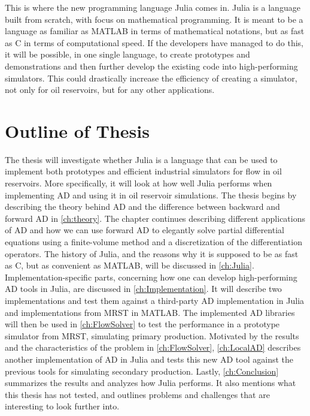 This is where the new programming language Julia comes in. Julia is a language built from scratch, with focus on mathematical programming. It is meant to be a language as familiar as MATLAB in terms of mathematical notations, but as fast as C in terms of computational speed. If the developers have managed to do this, it will be possible, in one single language, to create prototypes and demonstrations and then further develop the existing code into high-performing simulators. This could drastically increase the efficiency of creating a simulator, not only for oil reservoirs, but for any other applications. 

\section{Outline of Thesis}
The thesis will investigate whether Julia is a language that can be used to implement both prototypes and efficient industrial simulators for flow in oil reservoirs. More specifically, it will look at how well Julia performs when implementing AD and using it in oil reservoir simulations. The thesis begins by describing the theory behind AD and the difference between backward and forward AD in \autoref{ch:theory}. The chapter continues describing different applications of AD and how we can use forward AD to elegantly solve partial differential equations using a finite-volume method and a discretization of the differentiation operators. The history of Julia, and the reasons why it is supposed to be as fast as C, but as convenient as MATLAB, will be discussed in \autoref{ch:Julia}. Implementation-specific parts, concerning how one can develop high-performing AD tools in Julia, are discussed in \autoref{ch:Implementation}. It will describe two implementations and test them against a third-party AD implementation in Julia and implementations from MRST in MATLAB. The implemented AD libraries will then be used in \autoref{ch:FlowSolver} to test the performance in a prototype simulator from MRST, simulating primary production. Motivated by the results and the characteristics of the problem in \autoref{ch:FlowSolver}, \autoref{ch:LocalAD} describes another implementation of AD in Julia and tests this new AD tool against the previous tools for simulating secondary production. Lastly, \autoref{ch:Conclusion} summarizes the results and analyzes how Julia performs. It also mentions what this thesis has not tested, and outlines problems and challenges that are interesting to look further into.